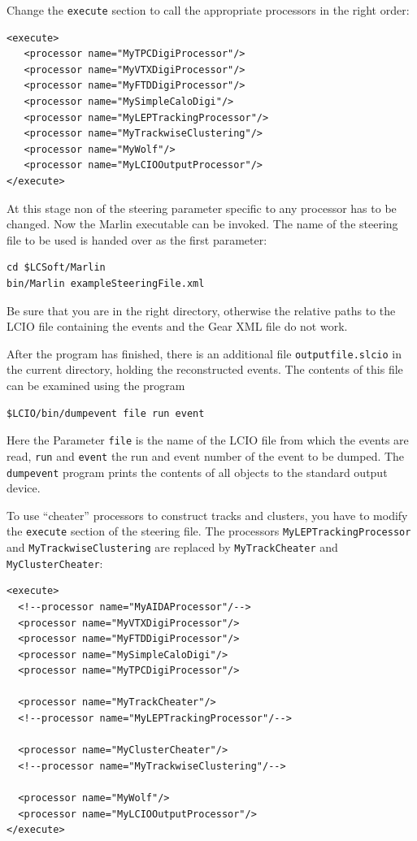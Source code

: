 Change the {\tt execute} section to call the appropriate processors in the
right order:

\begin{verbatim}
<execute>
   <processor name="MyTPCDigiProcessor"/>
   <processor name="MyVTXDigiProcessor"/>
   <processor name="MyFTDDigiProcessor"/>
   <processor name="MySimpleCaloDigi"/>
   <processor name="MyLEPTrackingProcessor"/>
   <processor name="MyTrackwiseClustering"/>
   <processor name="MyWolf"/>
   <processor name="MyLCIOOutputProcessor"/>
</execute>
\end{verbatim}

At this stage non of the steering parameter specific to any 
processor has to be changed. Now the Marlin executable can be invoked. 
The name of the steering file to be used is handed over as the first 
parameter:

\begin{verbatim}
cd $LCSoft/Marlin
bin/Marlin exampleSteeringFile.xml
\end{verbatim}

Be sure that you are in the right directory, otherwise the relative
paths to the LCIO file containing the events and the Gear XML file do
not work. 

After the program has finished, there is an additional file 
{\tt outputfile.slcio} in the current directory, holding the reconstructed 
events. The contents of this file can be examined using the program

\begin{verbatim}
$LCIO/bin/dumpevent file run event
\end{verbatim}

Here the Parameter {\tt file} is the name of the LCIO file from which the 
events are read,
{\tt run} and {\tt event} the run and event number of the event to be dumped.
The {\tt dumpevent} program prints the contents of all objects to 
the standard output device.  

To use ``cheater'' processors to construct tracks and clusters,
you have to modify the {\tt execute} section of the steering file. 
The processors {\tt MyLEPTrackingProcessor} and {\tt MyTrackwiseClustering}
are replaced by {\tt MyTrackCheater} and {\tt MyClusterCheater}:

\begin{verbatim}
<execute>
  <!--processor name="MyAIDAProcessor"/-->
  <processor name="MyVTXDigiProcessor"/>
  <processor name="MyFTDDigiProcessor"/>
  <processor name="MySimpleCaloDigi"/>
  <processor name="MyTPCDigiProcessor"/>

  <processor name="MyTrackCheater"/>
  <!--processor name="MyLEPTrackingProcessor"/-->

  <processor name="MyClusterCheater"/>
  <!--processor name="MyTrackwiseClustering"/-->

  <processor name="MyWolf"/>
  <processor name="MyLCIOOutputProcessor"/>
</execute>
\end{verbatim}


